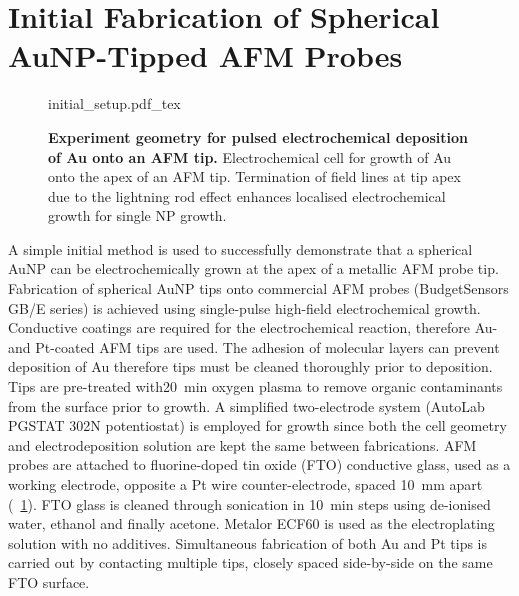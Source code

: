 \documentclass{article}
\begin{document}
\section{Initial Fabrication of Spherical AuNP-Tipped AFM Probes}
\label{sec:initial_fabrication}

\begin{figure}[bt]
\centering
\small
\def\svgwidth{0.6\textwidth}
{initial_setup.pdf_tex}
\caption[Experiment geometry for pulsed electrochemical deposition of Au onto an AFM tip]{\textbf{Experiment geometry for pulsed electrochemical deposition of Au onto an AFM tip.} Electrochemical cell for growth of Au onto the apex of an AFM tip. Termination of field lines at tip apex due to the lightning rod effect enhances localised electrochemical growth for single NP growth.}
\label{fig:initial_setup}
\end{figure}

A simple initial method is used to successfully demonstrate that a spherical AuNP can be electrochemically grown at the apex of a metallic AFM probe tip.
Fabrication of spherical AuNP tips onto commercial AFM probes (BudgetSensors GB/E series) is achieved using single-pulse high-field electrochemical growth. Conductive coatings are required for the electrochemical reaction, therefore Au- and Pt-coated AFM tips are used. The adhesion of molecular layers can prevent deposition of Au therefore tips must be cleaned thoroughly prior to deposition. Tips are pre-treated with\SI{20}{\minute} oxygen plasma to remove organic contaminants from the surface prior to growth. A simplified two-electrode system (AutoLab PGSTAT 302N potentiostat) is employed for growth since both the cell geometry and electrodeposition solution are kept the same between fabrications. AFM probes are attached to fluorine-doped tin oxide (FTO) conductive glass, used as a working electrode, opposite a Pt wire counter-electrode, spaced \SI{10}{mm} apart (\figurename~\ref{fig:initial_setup}). FTO glass is cleaned through sonication in \SI{10}{\minute} steps using de-ionised water, ethanol and finally acetone. Metalor ECF60 is used as the electroplating solution with no additives. Simultaneous fabrication of both Au and Pt tips is carried out by contacting multiple tips, closely spaced side-by-side on the same FTO surface.
\end{document}
